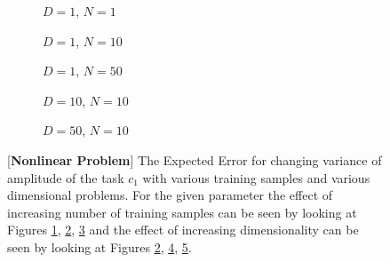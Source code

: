\begin{figure}[!h]
  \centering
    \begin{subfigure}{0.3\textwidth}
      \centering
      \caption{$D=1$, $N=1$}
      \label{fig:nonlinear-c1-N-1-D-1}
    \end{subfigure}
    \begin{subfigure}{0.3\textwidth}
      \centering
      \caption{$D=1$, $N=10$}
      \label{fig:nonlinear-c1-N-10-D-1}
    \end{subfigure}
    \begin{subfigure}{0.3\textwidth}
      \centering
      \caption{$D=1$, $N=50$}
      \label{fig:nonlinear-c1-N-50-D-1}
    \end{subfigure}

    \begin{subfigure}{0.3\textwidth}
      \centering
      \caption{$D=10$, $N=10$}
      \label{fig:nonlinear-c1-N-10-D-10}
    \end{subfigure}
    \begin{subfigure}{0.3\textwidth}
      \centering
      \caption{$D=50$, $N=10$}
      \label{fig:nonlinear-c1-N-10-D-50}
    \end{subfigure}  

  \caption{[\textbf{Nonlinear Problem}] The Expected Error for changing variance of amplitude of the task $c_1$ with various training samples and various dimensional problems. For the given parameter the effect of increasing number of training samples can be seen by looking at Figures \ref{fig:nonlinear-c1-N-1-D-1}, \ref{fig:nonlinear-c1-N-10-D-1}, \ref{fig:nonlinear-c1-N-50-D-1} and the effect of increasing dimensionality can be seen by looking at Figures \ref{fig:nonlinear-c1-N-10-D-1}, \ref{fig:nonlinear-c1-N-10-D-10}, \ref{fig:nonlinear-c1-N-10-D-50}.}\label{fig:nonlinear-c1}
\end{figure}

